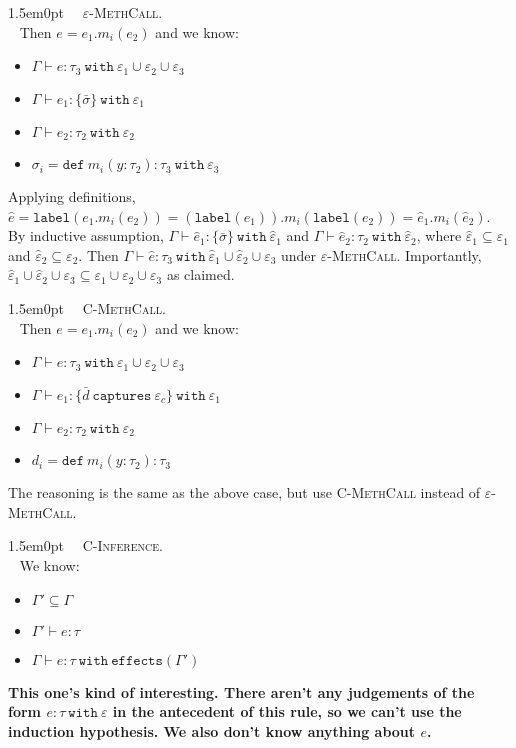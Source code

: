 \documentclass{llncs}
\newcommand{\keywadj}[1]{\mathtt{#1}}
\newcommand{\keyw}[1]{\keywadj{#1}~}
\newcommand{\proofcase}[2]{
	\begin{adjustwidth}{1.5em}{0pt}
		\fbox{Case.}~~#1. \\ ~#2
	\end{adjustwidth}
}
\newcommand{\type}[2]{
	#1~\keyw{with} #2
}
\begin{document}
{\proofcase{\textsc{$\varepsilon$-MethCall}} {
Then $e = e_1.m_i(e_2)$ and we know:
\begin{itemize}
	\item $\Gamma \vdash e : \type{\tau_3}{\varepsilon_1 \cup \varepsilon_2 \cup \varepsilon_3}$
	\item $\Gamma \vdash e_1 : \{ \bar \sigma \}~\keyw{with} \varepsilon_1$
	\item $\Gamma \vdash e_2 : \type{\tau_2}{\varepsilon_2}$
	\item $\sigma_i = \keyw{def} m_i(y : \tau_2) : \tau_3~\keyw{with} \varepsilon_3$ 
\end{itemize}
Applying definitions, $\hat e = \keywadj{label}(e_1.m_i(e_2)) = (\keywadj{label}(e_1)).m_i(\keywadj{label}(e_2)) = \hat e_1.m_i(\hat e_2)$. By inductive assumption, $\Gamma \vdash \hat e_1 : \{ \bar \sigma \}~\keyw{with} \hat \varepsilon_1$ and $\Gamma \vdash \hat e_2 : \type{\tau_2}{\hat \varepsilon_2}$, where $\hat \varepsilon_1 \subseteq \varepsilon_1$ and $\hat \varepsilon_2 \subseteq \varepsilon_2$. Then $\Gamma \vdash \hat e : \tau_3~\keyw{with} \hat \varepsilon_1 \cup \hat \varepsilon_2 \cup \varepsilon_3$ under \textsc{$\varepsilon$-MethCall}. Importantly, $\hat \varepsilon_1 \cup \hat \varepsilon_2 \cup \varepsilon_3 \subseteq \varepsilon_1 \cup \varepsilon_2 \cup \varepsilon_3$ as claimed.\\
}


\proofcase{\textsc{C-MethCall}} {
Then $e = e_1.m_i(e_2)$ and we know:
\begin{itemize}
	\item $\Gamma \vdash e : \type{\tau_3}{\varepsilon_1 \cup \varepsilon_2 \cup \varepsilon_3}$
	\item $\Gamma \vdash e_1 : \{ \bar d~\keyw{captures} \varepsilon_c \}~\keyw{with} \varepsilon_1$
	\item $\Gamma \vdash e_2 : \type{\tau_2}{\varepsilon_2}$
	\item $d_i = \keyw{def} m_i(y : \tau_2) : \tau_3$ 
\end{itemize}
The reasoning is the same as the above case, but use \textsc{C-MethCall} instead of \textsc{$\varepsilon$-MethCall}.\\
}

\proofcase{\textsc{C-Inference}}{
We know:
\begin{itemize}
	\item $\Gamma' \subseteq \Gamma$
	\item $\Gamma' \vdash e : \tau$
	\item $\Gamma \vdash e : \tau~\keyw{with} \keywadj{effects}(\Gamma')$
\end{itemize}
	\textbf{This one's kind of interesting. There aren't any judgements of the form $e : \tau~\keyw{with} \varepsilon$ in the antecedent of this rule, so we can't use the induction hypothesis. We also don't know anything about $e$.\\}
}
	
}
\end{document}
